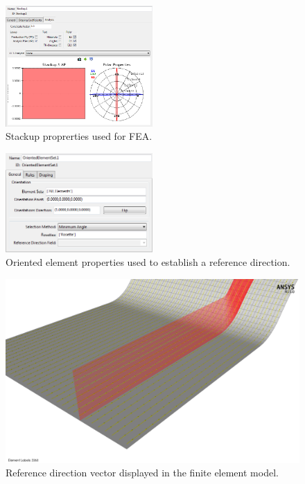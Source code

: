 \begin{figure}[htp]
\centering
\includegraphics[width=0.5\textwidth]{./figures/fea/fea-acp-stackup-proprties}
\caption{Stackup proprerties used for FEA.}
\label{fig:fea-acp-stackup-proprties}
\end{figure}


\begin{figure}[htp]
\centering
\includegraphics[width=0.5\textwidth]{./figures/fea/fea-acp-oriented-element-properties}
\caption{Oriented element properties used to establish a reference direction.}
\label{fig:fea-acp-oriented-element-properties}
\end{figure}

\begin{figure}[htp]
\centering
\includegraphics[width=1\textwidth]{./figures/fea/fea-acp-reference-direction}
\caption{Reference direction vector displayed in the finite element model.}
\label{fig:fea-acp-reference-direction}
\end{figure}

